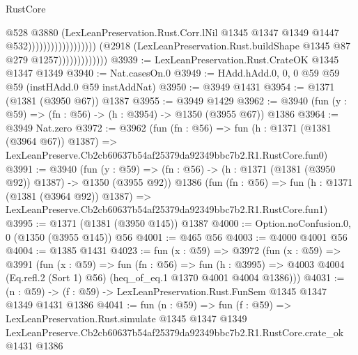 \begin{lexlean}{RustCore}
\begin{coremodule}
                                                            @528
                                                            @3880
                                                            (LexLeanPreservation.Rust.Corr.lNil
                                                              @1345
                                                              @1347
                                                              @1349
                                                              @1447
                                                              @532))))))))))))))))))
                          (@2918
                            (LexLeanPreservation.Rust.buildShape @1345 @87 @279 @1257)))))))))))))
@3939 := LexLeanPreservation.Rust.CrateOK @1345 @1347 @1349
@3940 := Nat.casesOn.{0}
@3949 := HAdd.hAdd.{0, 0, 0} @59 @59 @59 (instHAdd.{0} @59 instAddNat)
@3950 := @3949 @1431
@3954 := @1371 (@1381 (@3950 @67)) @1387
@3955 := @3949 @1429
@3962 := @3940 (fun (y : @59) => (fn : @56) -> (h : @3954) -> @1350 (@3955 @67)) @1386
@3964 := @3949 Nat.zero
@3972 := @3962
    (fun (fn : @56) =>
    fun (h : @1371 (@1381 (@3964 @67)) @1387) =>
    LexLeanPreserve.Cb2cb60637b54af25379da92349bbc7b2.R1.RustCore.fun0)
@3991 := @3940
    (fun (y : @59) => (fn : @56) -> (h : @1371 (@1381 (@3950 @92)) @1387) -> @1350 (@3955 @92))
    @1386
    (fun (fn : @56) =>
    fun (h : @1371 (@1381 (@3964 @92)) @1387) =>
    LexLeanPreserve.Cb2cb60637b54af25379da92349bbc7b2.R1.RustCore.fun1)
@3995 := @1371 (@1381 (@3950 @145)) @1387
@4000 := Option.noConfusion.{0, 0} (@1350 (@3955 @145)) @56
@4001 := @465 @56
@4003 := @4000 @4001 @56
@4004 := @1385 @1431
@4023 := fun (x : @59) =>
  @3972
    (fun (x : @59) =>
    @3991
      (fun (x : @59) =>
      fun (fn : @56) =>
      fun (h : @3995) =>
      @4003 @4004 (Eq.refl.{2} (Sort 1) @56) (heq_of_eq.{1} @1370 @4001 @4004 @1386)))
@4031 := (n : @59) -> (f : @59) -> LexLeanPreservation.Rust.FunSem @1345 @1347 @1349 @1431 @1386
@4041 := fun (n : @59) =>
  fun (f : @59) =>
  LexLeanPreservation.Rust.simulate
    @1345
    @1347
    @1349
    LexLeanPreserve.Cb2cb60637b54af25379da92349bbc7b2.R1.RustCore.crate_ok
    @1431
    @1386
\end{coremodule}
\end{lexlean}
